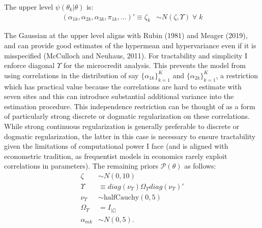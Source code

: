 \documentclass[AER]{AEA}
\begin{document}
 The upper level $\psi(\theta_k | \theta)$ is:
\begin{equation}\label{upperPDF}
\begin{aligned}
(\alpha_{1k}, \alpha_{2k}, \alpha_{3k}, \pi_{1k},...)' \equiv \zeta_k &\sim N(\zeta, \Upsilon) \; \forall \; k
\end{aligned} \end{equation}

The Gaussian at the upper level aligns with Rubin (1981) and Meager (2019), and can provide good estimates of the hypermean and hypervariance even if it is misspecified (McCulloch and Neuhaus, 2011). For tractability and simplicity I enforce diagonal $\Upsilon$ for the microcredit analysis. This prevents the model from using correlations in the distribution of say $\{\alpha_{1k}\}_{k=1}^{K}$ and $\{\alpha_{2k}\}_{k=1}^{K}$, a restriction which has practical value because the correlations are hard to estimate with seven sites and this can introduce substantial additional variance into the estimation procedure. This independence restriction can be thought of as a form of particularly strong discrete or dogmatic regularization on these correlations. While strong continuous regularization is generally preferable to discrete or dogmatic regularization, the latter in this case is necessary to ensure tractability given the limitations of computational power I face (and is aligned with econometric tradition, as frequentist models in economics rarely exploit correlations in parameters). The remaining priors $\mathcal{P}(\theta)$ as follows:
\begin{equation}
\begin{aligned}
\zeta &\sim N(0,10)\\
\Upsilon &\equiv diag(\nu_{\Upsilon})\Omega_{\Upsilon} diag(\nu_{\Upsilon})' \\
\nu_{\Upsilon} &\sim \text{halfCauchy}(0,5)\\
\Omega_{\Upsilon} &= I_{| \zeta |} \\
\alpha_{mk} &\sim N(0,5).
\end{aligned} \end{equation}
\end{document}
